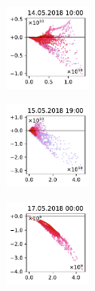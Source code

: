 \begin{figure}[H]
    \centering
    \begin{subfigure}
        \centering
        \includegraphics[width=0.30\textwidth,valign=t]{evaluation/figures/perturbations/perturbation-14.05.2018:10.00-so2-div-1.5.pdf}
    \end{subfigure}
    \begin{subfigure}
        \centering
        \includegraphics[width=0.30\textwidth,valign=t]{evaluation/figures/perturbations/perturbation-15.05.2018:19.00-so2-div-1.5.pdf}
    \end{subfigure}
    \begin{subfigure}
        \centering
        \includegraphics[width=0.30\textwidth,valign=t]{evaluation/figures/perturbations/perturbation-17.05.2018:00.00-so2-div-1.5.pdf}
    \end{subfigure}


\end{figure}
